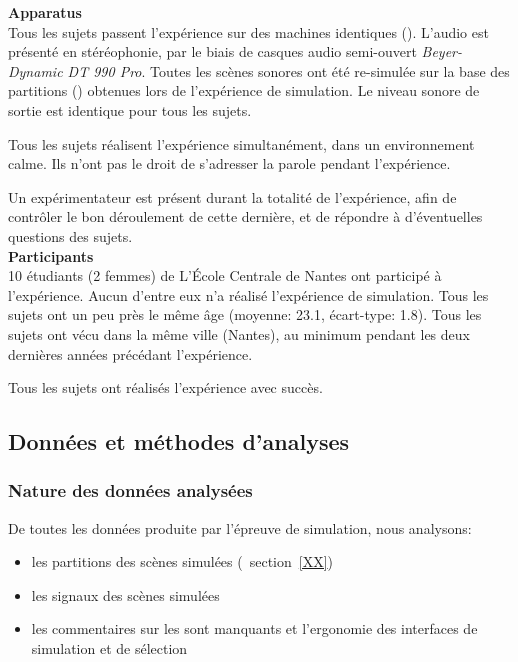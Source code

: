 \textbf{Apparatus} \\

Tous les sujets passent l'expérience sur des machines identiques (). L'audio est présenté en stéréophonie, par le biais de casques audio semi-ouvert \emph{Beyer-Dynamic DT 990 Pro}. Toutes les scènes sonores ont été re-simulée sur la base des partitions () obtenues lors de l'expérience de simulation. Le niveau sonore de sortie est identique pour tous les sujets.

Tous les sujets réalisent l'expérience simultanément, dans un environnement calme. Ils n'ont pas le droit de s'adresser la parole pendant l'expérience.

Un expérimentateur est présent durant la totalité de l'expérience, afin de contrôler le bon déroulement de cette dernière, et de répondre à d'éventuelles questions des sujets.  \\

\textbf{Participants} \\

10 étudiants (2 femmes) de L’École Centrale de Nantes ont participé à l'expérience. Aucun d'entre eux n'a réalisé l'expérience de simulation. Tous les sujets ont un peu près le même âge (moyenne: 23.1, écart-type: 1.8). Tous les sujets ont vécu dans la même ville (Nantes), au minimum pendant les deux dernières années précédant l'expérience.

Tous les sujets ont réalisés l'expérience avec succès.

\subsection{Données et méthodes d'analyses}

\subsubsection{Nature des données analysées}

De toutes les données produite par l'épreuve de simulation, nous analysons:

\begin{itemize}
\item les partitions des scènes simulées (\Cf~section~\ref{XX})
\item les signaux des scènes simulées
\item les commentaires sur les sont manquants et l'ergonomie des interfaces de simulation et de sélection
\end{itemize}

